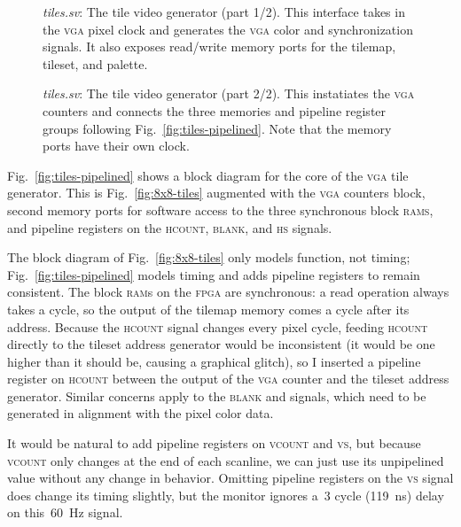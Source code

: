 \documentclass[11pt]{article}
\newcommand{\figref}[1]{Fig.~\ref{fig:#1}}
\begin{document}
\begin{figure}
  
  \caption{\emph{tiles.sv}: The tile video generator (part 1/2).  This
    interface takes in the \textsc{vga} pixel clock and generates
    the \textsc{vga} color and synchronization signals.  It also
    exposes read/write memory ports for the tilemap, tileset, and palette.}
  \label{fig:tiles-p1}
\end{figure}

\begin{figure}
  
  \caption{\emph{tiles.sv}: The tile video generator (part 2/2).  This
    instatiates the \textsc{vga} counters and connects the three
    memories and pipeline register groups following
    \figref{tiles-pipelined}.  Note that the memory ports have their own clock.}
  \label{fig:tiles-p2}
\end{figure}

\figref{tiles-pipelined} shows a block diagram for the core of the
\textsc{vga} tile generator.  This is \figref{8x8-tiles} augmented
with the \textsc{vga} counters block, second memory ports for software
access to the three synchronous block \textsc{rams}, and pipeline
registers on the \textsc{hcount}, \textsc{blank}, and \textsc{hs}
signals.

The block diagram of \figref{8x8-tiles} only models function, not
timing; \figref{tiles-pipelined} models timing and adds pipeline
registers to remain consistent.  The block \textsc{ram}s on the
\textsc{fpga} are synchronous: a read operation always takes a cycle,
so the output of the tilemap memory comes a cycle after its address.
Because the \textsc{hcount} signal changes every pixel cycle, feeding
\textsc{hcount} directly to the tileset address generator would be
inconsistent (it would be one higher than it should be, causing a
graphical glitch), so I inserted a pipeline register on
\textsc{hcount} between the output of the \textsc{vga} counter and the
tileset address generator.  Similar concerns apply to the
\textsc{blank} and  signals, which need to be generated in
alignment with the pixel color data.

It would be natural to add pipeline registers on \textsc{vcount}
and \textsc{vs}, but because \textsc{vcount} only changes at the end
of each scanline, we can just use its unpipelined value without any
change in behavior.  Omitting pipeline registers on the \textsc{vs}
signal does change its timing slightly, but the monitor ignores a~3
cycle (119~ns) delay on this~60~Hz signal.
\end{document}
